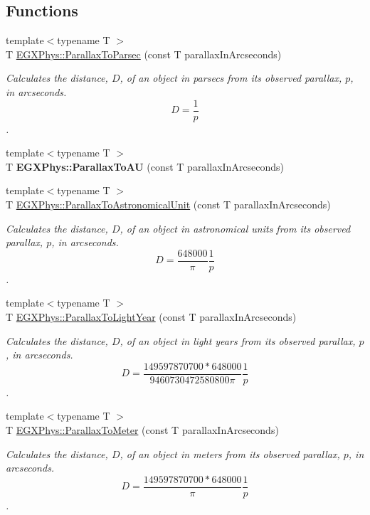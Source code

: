\subsection*{Functions}
\begin{DoxyCompactItemize}
\item 
{\footnotesize template$<$typename T $>$ }\\T \mbox{\hyperlink{group___e_g_x_phys-_astrophysic-_parallax_gab42dbec142e1a47925fc45e899845861}{E\+G\+X\+Phys\+::\+Parallax\+To\+Parsec}} (const T parallax\+In\+Arcseconds)
\begin{DoxyCompactList}\small\item\em Calculates the distance, $D$, of an object in parsecs from its observed parallax, $p$, in arcseconds. \[ D=\dfrac{1}{p}\]. \end{DoxyCompactList}\item 
\mbox{\label{namespace_e_g_x_phys_a2085f91170baba79a7fcc8a0ba77d1eb}} 
{\footnotesize template$<$typename T $>$ }\\T {\bfseries E\+G\+X\+Phys\+::\+Parallax\+To\+AU} (const T parallax\+In\+Arcseconds)
\item 
{\footnotesize template$<$typename T $>$ }\\T \mbox{\hyperlink{group___e_g_x_phys-_astrophysic-_parallax_gaee6df9899f30baa3d659597abe89066a}{E\+G\+X\+Phys\+::\+Parallax\+To\+Astronomical\+Unit}} (const T parallax\+In\+Arcseconds)
\begin{DoxyCompactList}\small\item\em Calculates the distance, $D$, of an object in astronomical units from its observed parallax, $p$, in arcseconds. \[ D=\dfrac{648000}{\pi}\dfrac{1}{p}\]. \end{DoxyCompactList}\item 
{\footnotesize template$<$typename T $>$ }\\T \mbox{\hyperlink{group___e_g_x_phys-_astrophysic-_parallax_gacaec31498f264e2a1dc285062a394de2}{E\+G\+X\+Phys\+::\+Parallax\+To\+Light\+Year}} (const T parallax\+In\+Arcseconds)
\begin{DoxyCompactList}\small\item\em Calculates the distance, $D$, of an object in light years from its observed parallax, $p$, in arcseconds. \[ D=\dfrac{149597870700 * 648000}{9460730472580800 \pi} \dfrac{1}{p}\]. \end{DoxyCompactList}\item 
{\footnotesize template$<$typename T $>$ }\\T \mbox{\hyperlink{group___e_g_x_phys-_astrophysic-_parallax_ga94912bf8b98a04cccab8ef19eaa89b6a}{E\+G\+X\+Phys\+::\+Parallax\+To\+Meter}} (const T parallax\+In\+Arcseconds)
\begin{DoxyCompactList}\small\item\em Calculates the distance, $D$, of an object in meters from its observed parallax, $p$, in arcseconds. \[ D=\dfrac{149597870700 * 648000}{\pi}\dfrac{1}{p}\]. \end{DoxyCompactList}\end{DoxyCompactItemize}


